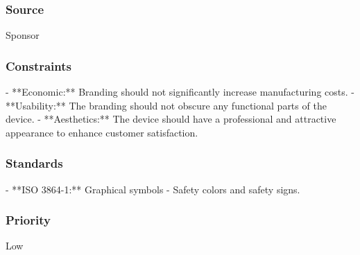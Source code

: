 \subsubsection{Source}
Sponsor
\subsubsection{Constraints}
- **Economic:** Branding should not significantly increase manufacturing costs.
- **Usability:** The branding should not obscure any functional parts of the device.
- **Aesthetics:** The device should have a professional and attractive appearance to enhance customer satisfaction.
\subsubsection{Standards}
- **ISO 3864-1:** Graphical symbols - Safety colors and safety signs.
\subsubsection{Priority}
Low
